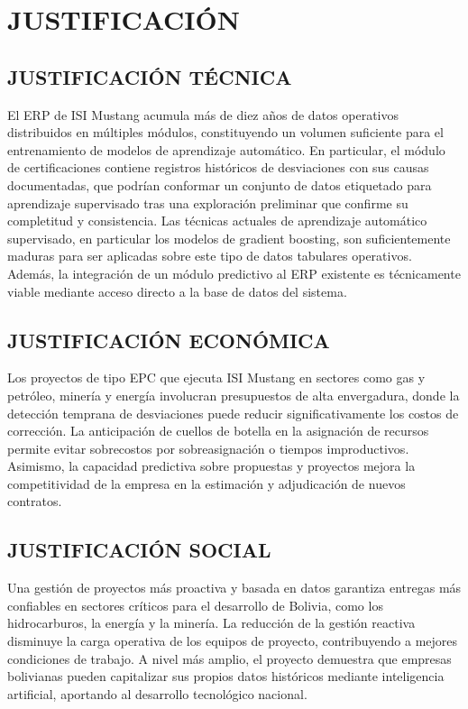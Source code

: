 \documentclass{univalle-perfil}
\begin{document}
\section{JUSTIFICACIÓN}

\subsection{JUSTIFICACIÓN TÉCNICA}

El ERP de ISI Mustang acumula más de diez años de datos operativos distribuidos en múltiples módulos, constituyendo un volumen suficiente para el entrenamiento de modelos de aprendizaje automático. En particular, el módulo de certificaciones contiene registros históricos de desviaciones con sus causas documentadas, que podrían conformar un conjunto de datos etiquetado para aprendizaje supervisado tras una exploración preliminar que confirme su completitud y consistencia. Las técnicas actuales de aprendizaje automático supervisado, en particular los modelos de gradient boosting, son suficientemente maduras para ser aplicadas sobre este tipo de datos tabulares operativos. Además, la integración de un módulo predictivo al ERP existente es técnicamente viable mediante acceso directo a la base de datos del sistema.

\subsection{JUSTIFICACIÓN ECONÓMICA}

Los proyectos de tipo EPC que ejecuta ISI Mustang en sectores como gas y petróleo, minería y energía involucran presupuestos de alta envergadura, donde la detección temprana de desviaciones puede reducir significativamente los costos de corrección. La anticipación de cuellos de botella en la asignación de recursos permite evitar sobrecostos por sobreasignación o tiempos improductivos. Asimismo, la capacidad predictiva sobre propuestas y proyectos mejora la competitividad de la empresa en la estimación y adjudicación de nuevos contratos.

\subsection{JUSTIFICACIÓN SOCIAL}

Una gestión de proyectos más proactiva y basada en datos garantiza entregas más confiables en sectores críticos para el desarrollo de Bolivia, como los hidrocarburos, la energía y la minería. La reducción de la gestión reactiva disminuye la carga operativa de los equipos de proyecto, contribuyendo a mejores condiciones de trabajo. A nivel más amplio, el proyecto demuestra que empresas bolivianas pueden capitalizar sus propios datos históricos mediante inteligencia artificial, aportando al desarrollo tecnológico nacional.
\end{document}
